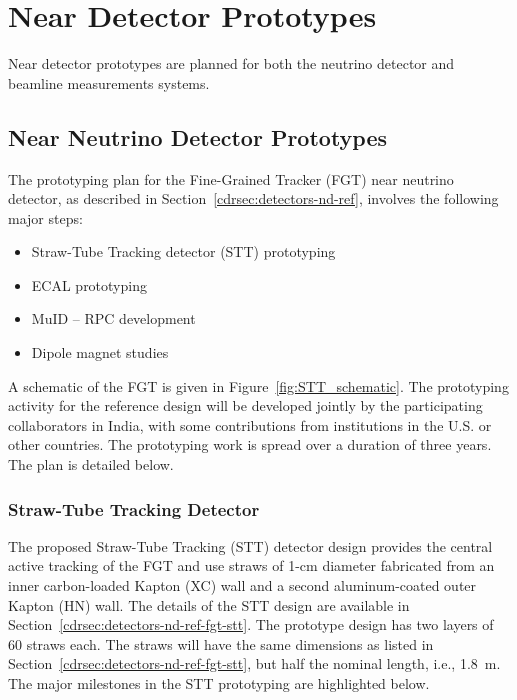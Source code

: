 
\section{Near Detector Prototypes}
\label{sec:proto-nd}
Near detector prototypes are planned for both the neutrino detector and beamline measurements systems.

\subsection{Near Neutrino Detector Prototypes}
\label{sec:proto-nd-nnd}
The prototyping plan for the Fine-Grained Tracker (FGT) near neutrino
detector, as described in Section~\ref{cdrsec:detectors-nd-ref},
involves the following major steps:
\begin{itemize}
\item Straw-Tube Tracking detector (STT) prototyping
\item ECAL prototyping
\item MuID -- RPC development
\item Dipole magnet studies
\end{itemize}

A schematic of the FGT is given in Figure~\ref{fig:STT_schematic}. The
prototyping activity for the reference design will be developed
jointly by the participating collaborators in India, with some
contributions from institutions in the U.S. or other countries.  The
prototyping work is spread over a duration of three years. The plan is
detailed below.

\subsubsection{Straw-Tube Tracking Detector}

The proposed Straw-Tube Tracking (STT) detector design
provides the central active tracking of the FGT and use straws of
1-cm diameter fabricated from an inner carbon-loaded Kapton (XC) wall
and a second aluminum-coated outer Kapton (HN) wall. The details of the
STT design are available in
Section~\ref{cdrsec:detectors-nd-ref-fgt-stt}. The prototype design
has two layers of 60 straws each.  The straws will have the
same dimensions as listed in
Section~\ref{cdrsec:detectors-nd-ref-fgt-stt}, but half the nominal
length, i.e., 1.8~m. The major milestones in the STT prototyping
are highlighted below.


